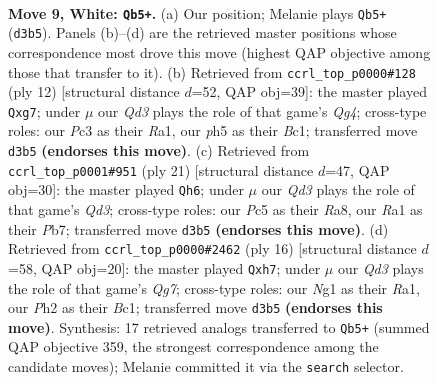 \documentclass[11pt]{article}
\begin{document}
\clearpage

\begin{figure}[p]\centering
\begin{subfigure}{0.46\textwidth}\centering
\resizebox{\linewidth}{!}{%
\newchessgame
\chessboard[
  setfen={rnbqk2r/pp2n1p1/4p3/2PpPp1p/8/P1PQ4/2P2PPP/R1B1KBNR w KQkq f6 0 9},
  showmover=false,
  pgfstyle=straightmove, color=movearrow, markmove={d3-b5}
]}
\caption{}
\end{subfigure}\hfill
\begin{subfigure}{0.46\textwidth}\centering
\resizebox{\linewidth}{!}{%
\newchessgame
\chessboard[
  setfen={rnbqk2r/ppp2ppp/4pn2/8/3Pp1Q1/P1P5/2P2PPP/R1B1KBNR w KQkq - 2 7},
  showmover=false,
  pgfstyle=straightmove, color=movearrow, markmove={g4-g7}
]}
\caption{}
\end{subfigure}
\\[4pt]
\begin{subfigure}{0.46\textwidth}\centering
\resizebox{\linewidth}{!}{%
\newchessgame
\chessboard[
  setfen={r1b1k2r/ppp1bp1p/n2q4/3Ppp2/2P5/P1N5/1PQ2PPP/R3KBNR b KQkq - 0 11},
  showmover=false,
  pgfstyle=straightmove, color=movearrow, markmove={d6-h6}
]}
\caption{}
\end{subfigure}\hfill
\begin{subfigure}{0.46\textwidth}\centering
\resizebox{\linewidth}{!}{%
\newchessgame
\chessboard[
  setfen={rnbqk1r1/pp2npQp/4p3/3pP3/3p4/P1P5/2P2PPP/R1B1KBNR w KQq - 1 9},
  showmover=false,
  pgfstyle=straightmove, color=movearrow, markmove={g7-h7}
]}
\caption{}
\end{subfigure}
\caption{\textbf{Move 9, White: \texttt{Qb5+}.} (a) Our position; Melanie plays \texttt{Qb5+} (\texttt{d3b5}). Panels (b)--(d) are the retrieved master positions whose correspondence most drove this move (highest QAP objective among those that transfer to it). (b) Retrieved from \texttt{ccrl\_top\_p0000\#128} (ply 12) [structural distance $d$=52, QAP obj=39]: the master played \texttt{Qxg7}; under $\mu$ our \emph{Qd3} plays the role of that game's \emph{Qg4}; cross-type roles: our \emph{P}c3 as their \emph{R}a1, our \emph{p}h5 as their \emph{B}c1; transferred move \texttt{d3b5} \textbf{(endorses this move)}. (c) Retrieved from \texttt{ccrl\_top\_p0001\#951} (ply 21) [structural distance $d$=47, QAP obj=30]: the master played \texttt{Qh6}; under $\mu$ our \emph{Qd3} plays the role of that game's \emph{Qd3}; cross-type roles: our \emph{P}c5 as their \emph{R}a8, our \emph{R}a1 as their \emph{P}b7; transferred move \texttt{d3b5} \textbf{(endorses this move)}. (d) Retrieved from \texttt{ccrl\_top\_p0000\#2462} (ply 16) [structural distance $d$=58, QAP obj=20]: the master played \texttt{Qxh7}; under $\mu$ our \emph{Qd3} plays the role of that game's \emph{Qg7}; cross-type roles: our \emph{N}g1 as their \emph{R}a1, our \emph{P}h2 as their \emph{B}c1; transferred move \texttt{d3b5} \textbf{(endorses this move)}. Synthesis: 17 retrieved analogs transferred to \texttt{Qb5+} (summed QAP objective 359, the strongest correspondence among the candidate moves); Melanie committed it via the \texttt{search} selector.}
\label{fig:thought-m16}
\end{figure}
\end{document}
